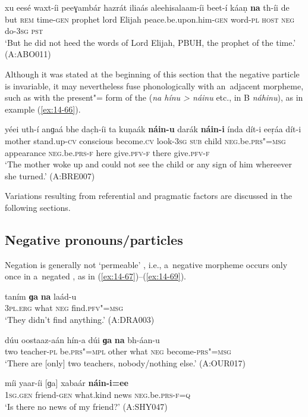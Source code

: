 \ex
\label{ex:14-65}
\gll xu eesé waxt-íi peeɣambár hazrát iliaás aleehisalaam-íi beet-í káaṇ \textbf{na} th-íi de \\
but \textsc{rem} time-\textsc{gen} prophet lord  Elijah peace.be.upon.him-\textsc{gen} word-\textsc{pl} \textsc{host} \textsc{neg} do-\textsc{3sg} \textsc{pst} \\
\glt `But he did not heed the words of Lord Elijah, PBUH, the prophet of the time.' (A:ABO011)
\z

Although it was stated at the beginning of this section that the negative particle is invariable, it may nevertheless fuse phonologically with an~adjacent morpheme, such as with the present"= form of the  (\textit{na hínu {\textgreater} náinu} etc., in B \textit{náhinu}), as in example (\ref{ex:14-66}).

\ea
\label{ex:14-66}
\gll yéei uth-í anɡaá bhe dac̣h-íi ta kuṇaák \textbf{náin-u} darák \textbf{náin-i} índa dít-i eeṛáa dít-i \\
mother stand.up-\textsc{cv} conscious become.\textsc{cv} look-\textsc{3sg}  \textsc{sub} child \textsc{neg.}be.\textsc{prs"=msg} appearance \textsc{neg.}be.\textsc{prs-f}  here give.\textsc{pfv-f} there give.\textsc{pfv-f} \\
\glt `The mother woke up and could not see the child or any sign of him whereever she turned.' (A:BRE007)
\z

Variations resulting from referential and pragmatic factors are discussed in the following sections.


\subsection{Negative pronouns/particles}
\label{subsec:14-3-2}

Negation is generally not `permeable' \citep[563]{ramat2006}, i.e., a~negative morpheme occurs only once in a~negated , as in (\ref{ex:14-67})--(\ref{ex:14-69}).

\begin{exe}
\ex
\label{ex:14-67}
\gll taním \textbf{ɡa} \textbf{na} laád-u \\
\textsc{3pl.erg} what \textsc{neg} find.\textsc{pfv"=msg}  \\
\glt `They didn't find anything.' (A:DRA003)

\ex
\label{ex:14-68}
\gll dúu oostaaz-aán hín-a dúi \textbf{ɡa} \textbf{na}  bh-áan-u \\
two teacher-\textsc{pl} be.\textsc{prs"=mpl} other what \textsc{neg}  become-\textsc{prs"=msg} \\
\glt `There are [only] two teachers, nobody/nothing else.' (A:OUR017)

\ex
\label{ex:14-69}
\gll míi yaar-íi [ɡa] xabaár \textbf{náin-i=ee} \\
\textsc{1sg.gen} friend-\textsc{gen} what.kind news \textsc{neg}.be.\textsc{prs-f=q}  \\
\glt `Is there no news of my friend?' (A:SHY047)
\end{exe}

